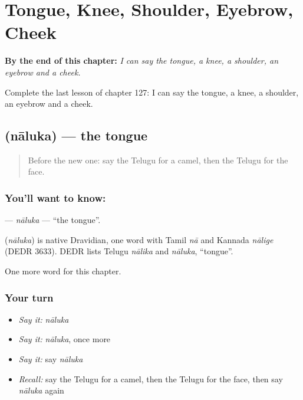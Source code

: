 
\chapter{Tongue, Knee, Shoulder, Eyebrow, Cheek}
\label{ch:te-tongue-knee-shoulder-eyebrow-cheek}

\begin{chapteropening}
\textbf{By the end of this chapter:} \emph{I can say the tongue, a knee, a shoulder, an eyebrow and a cheek.}

Complete the last lesson of chapter 127: I can say the tongue, a knee, a shoulder, an eyebrow and a cheek.
\end{chapteropening}

\section[\texorpdfstring{\te{నాలుక} (nāluka)}{నాలుక (nāluka)}]{ (nāluka) — the tongue}

\label{lesson:TE-C127-naluka}



\begin{quote}
Before the new one: say the Telugu for a camel, then the Telugu for the face.
\end{quote}

\subsection*{You'll want to know: }
\textbf{} — \emph{nāluka} — \textquotedblleft{}the tongue\textquotedblright{}.

\begin{cousinweb}
\textbf{} (\emph{nāluka}) is native Dravidian, one word with Tamil \emph{nā} and Kannada \emph{nālige} (DEDR 3633). DEDR lists Telugu \emph{nālika} and \emph{nāluka}, \textquotedblleft{}tongue\textquotedblright{}.
\end{cousinweb}

\begin{grammarlens}[title={What you've built}]
One more word for this chapter.
\end{grammarlens}

\subsection*{Your turn}
\begin{itemize}
\raggedright
  \item \emph{Say it:} \emph{nāluka}
  \item \emph{Say it:} \emph{nāluka}, once more
  \item \emph{Say it:} say \emph{nāluka}
  \item \emph{Recall:} say the Telugu for a camel, then the Telugu for the face, then say \emph{nāluka} again
\end{itemize}

